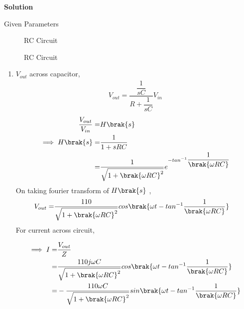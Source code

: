 \documentclass[journal,12pt,twocolumn]{IEEEtran}
\theoremstyle{remark}
\begin{document}
\textbf{Solution}
\fi
\begin{table}[!h]
	\centering
	
	\vspace{6 pt}
	\caption{Given Parameters}
	\label{tab:12.7.15.10}
\end{table}
\begin{figure}[!h]
	\centering
	
	\caption{RC Circuit}
	\label{fig:12.7.15.20}
\end{figure}
\vspace{2cm}
\begin{figure}[!h]
	\centering
	
	\caption{RC Circuit}
	\label{fig:12.7.15.30}
\end{figure}
\begin{enumerate} [label = (\alph*)]
\item $V_{out }$ across capacitor,
\begin{align}
 V_{out}=\dfrac{\dfrac{1}{sC}}{ R + \dfrac{1}{sC}}
 V_{in}
\end{align}
\begin{align}
\dfrac{V_{out}}{V_{in}} =& H\brak{s}\\
\implies H\brak{s} =& \dfrac{1}{1+sRC}\\
                    =& \dfrac{1}{\sqrt{1+\brak{\omega RC}^2}}e^{-tan^{-1}\dfrac{1}{\brak{\omega RC}}}
\end{align}
On taking fourier transform of $H\brak{s}$ ,
\begin{align}
V_{out} =& \dfrac{110}{\sqrt{1+\brak{\omega RC}^2}}cos\brak{\omega t - tan^{-1}\dfrac{1}{\brak{\omega RC}}}
\end{align}
For current across circuit,

\begin{align} 
\implies I=& \dfrac{V_{out}}{Z}\\
		 =& \dfrac{110j\omega C}{\sqrt{1+\brak{\omega RC}^2}}cos\brak{\omega t - tan^{-1}\dfrac{1}{\brak{\omega RC}}}\\
		 =& -\dfrac{110\omega C}{\sqrt{1+\brak{\omega RC}^2}}sin\brak{\omega t - tan^{-1}\dfrac{1}{\brak{\omega RC}}}
\end{align}


\end{enumerate}
\end{document}
